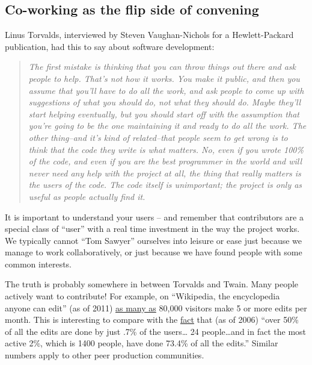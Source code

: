 \subsection{Co-working as the flip side of convening}

Linus Torvalds, interviewed by Steven Vaughan-Nichols for a
Hewlett-Packard publication, had this to say about software development:

\begin{quote}
\emph{The first mistake is thinking that you can throw things out there
and ask people to help. That's not how it works. You make it public, and
then you assume that you'll have to do all the work, and ask people to
come up with suggestions of what you should do, not what they should do.
Maybe they'll start helping eventually, but you should start off with
the assumption that you're going to be the one maintaining it and ready
to do all the work. The other thing--and it's kind of related--that
people seem to get wrong is to think that the code they write is what
matters. No, even if you wrote 100\% of the code, and even if you are
the best programmer in the world and will never need any help with the
project at all, the thing that really matters is the users of the code.
The code itself is unimportant; the project is only as useful as people
actually find it.}

\end{quote}
It is important to understand your users -- and remember that
contributors are a special class of ``user'' with a real time investment
in the way the project works. We typically cannot ``Tom Sawyer''
ourselves into leisure or ease just because we manage to work
collaboratively, or just because we have found people with some common
interests.

The truth is probably somewhere in between Torvalds and Twain. Many
people actively want to contribute! For example, on ``Wikipedia, the
encyclopedia anyone can edit'' (as of 2011)
\href{http://\%20http://www.readwriteweb.com/archives/wikipedias\_goal\_1\_billion\_monthly\_visitors\_by\_2015.php}{as
many as} 80,000 visitors make 5 or more edits per month. This is
interesting to compare with the
\href{http://www.aaronsw.com/weblog/whowriteswikipedia}{fact} that (as
of 2006) ``over 50\% of all the edits are done by just .7\% of the
users\ldots{} 24 people\ldots{}and in fact the most active 2\%, which is
1400 people, have done 73.4\% of all the edits.'' Similar numbers apply
to other peer production communities.

